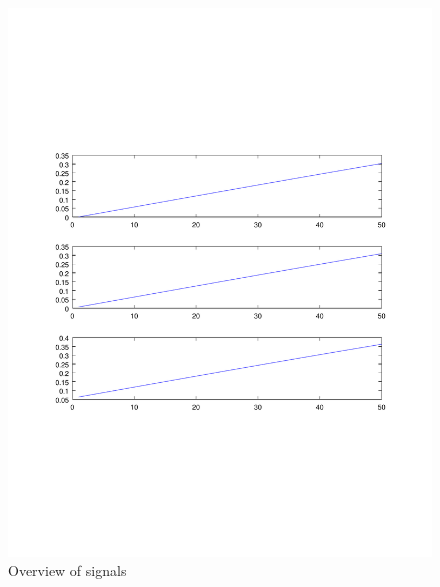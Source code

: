 \begin{figure}
\centering
\includegraphics[scale=0.4]{Figures/hifreqhisample}
\caption{Overview of signals}
\label{fig:windows10000}
\end{figure}

